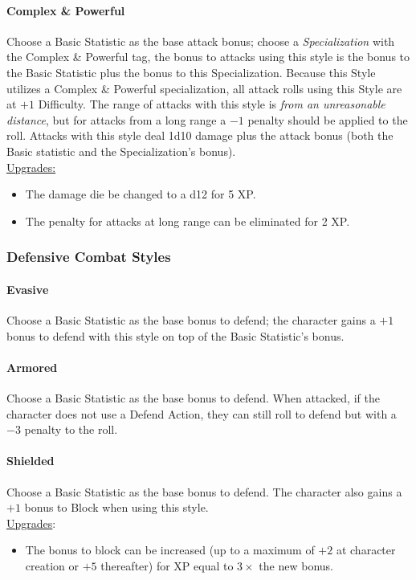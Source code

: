 \paragraph{Complex \& Powerful}
Choose a Basic Statistic as the base attack bonus; choose a \emph{Specialization} with the Complex \& Powerful tag, the bonus to attacks using this style is the bonus to the Basic Statistic plus the bonus to this Specialization.
Because this Style utilizes a Complex \& Powerful specialization, all attack rolls using this Style are at $+1$ Difficulty.
The range of attacks with this style is \emph{from an unreasonable distance}, but for attacks from a long range a $-1$ penalty should be applied to the roll.
Attacks with this style deal 1d10 damage plus the attack bonus (both the Basic statistic and the Specialization's bonus).
\\
\underline{Upgrades:}
\begin{itemize}
  \item[-] The damage die be changed to a d12 for 5 XP.
  \item[-] The penalty for attacks at long range can be eliminated for 2 XP.
\end{itemize}

\subsubsection{Defensive Combat Styles}
\paragraph{Evasive}
Choose a Basic Statistic as the base bonus to defend; the character gains a $+1$ bonus to defend with this style on top of the Basic Statistic's bonus.

\paragraph{Armored}
Choose a Basic Statistic as the base bonus to defend.
When attacked, if the character does not use a Defend Action, they can still roll to defend but with a $-3$ penalty to the roll.

\paragraph{Shielded}
Choose a Basic Statistic as the base bonus to defend.
The character also gains a $+1$ bonus to Block when using this style.
\\
\underline{Upgrades}:
\begin{itemize}
  \item[-] The bonus to block can be increased (up to a maximum of $+2$ at character creation or $+5$ thereafter) for XP equal to $3\times$ the new bonus.
\end{itemize}

